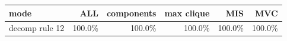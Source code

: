 \begin{tabular}{lrrrrr}
\toprule
mode & ALL & components & max clique & MIS & MVC \\
\midrule
decomp rule 12 & 100.0\% & 100.0\% & 100.0\% & 100.0\% & 100.0\% \\
\bottomrule
\end{tabular}
